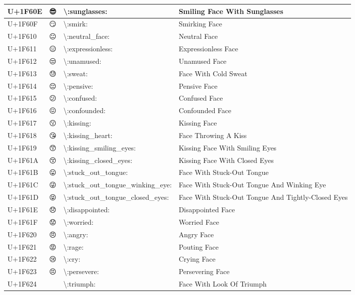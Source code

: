 \begin{table}[h]
\begin{tabulary}{\linewidth}{|L|L|L|L|}
\hline
U+1F60E & 😎 & {\textbackslash}:sunglasses: & Smiling Face With Sunglasses \\
\hline
U+1F60F & 😏 & {\textbackslash}:smirk: & Smirking Face \\
\hline
U+1F610 & 😐 & {\textbackslash}:neutral\_face: & Neutral Face \\
\hline
U+1F611 & 😑 & {\textbackslash}:expressionless: & Expressionless Face \\
\hline
U+1F612 & 😒 & {\textbackslash}:unamused: & Unamused Face \\
\hline
U+1F613 & 😓 & {\textbackslash}:sweat: & Face With Cold Sweat \\
\hline
U+1F614 & 😔 & {\textbackslash}:pensive: & Pensive Face \\
\hline
U+1F615 & 😕 & {\textbackslash}:confused: & Confused Face \\
\hline
U+1F616 & 😖 & {\textbackslash}:confounded: & Confounded Face \\
\hline
U+1F617 & 😗 & {\textbackslash}:kissing: & Kissing Face \\
\hline
U+1F618 & 😘 & {\textbackslash}:kissing\_heart: & Face Throwing A Kiss \\
\hline
U+1F619 & 😙 & {\textbackslash}:kissing\_smiling\_eyes: & Kissing Face With Smiling Eyes \\
\hline
U+1F61A & 😚 & {\textbackslash}:kissing\_closed\_eyes: & Kissing Face With Closed Eyes \\
\hline
U+1F61B & 😛 & {\textbackslash}:stuck\_out\_tongue: & Face With Stuck-Out Tongue \\
\hline
U+1F61C & 😜 & {\textbackslash}:stuck\_out\_tongue\_winking\_eye: & Face With Stuck-Out Tongue And Winking Eye \\
\hline
U+1F61D & 😝 & {\textbackslash}:stuck\_out\_tongue\_closed\_eyes: & Face With Stuck-Out Tongue And Tightly-Closed Eyes \\
\hline
U+1F61E & 😞 & {\textbackslash}:disappointed: & Disappointed Face \\
\hline
U+1F61F & 😟 & {\textbackslash}:worried: & Worried Face \\
\hline
U+1F620 & 😠 & {\textbackslash}:angry: & Angry Face \\
\hline
U+1F621 & 😡 & {\textbackslash}:rage: & Pouting Face \\
\hline
U+1F622 & 😢 & {\textbackslash}:cry: & Crying Face \\
\hline
U+1F623 & 😣 & {\textbackslash}:persevere: & Persevering Face \\
\hline
U+1F624 & 😤 & {\textbackslash}:triumph: & Face With Look Of Triumph \\

\end{tabulary}
\end{table}
